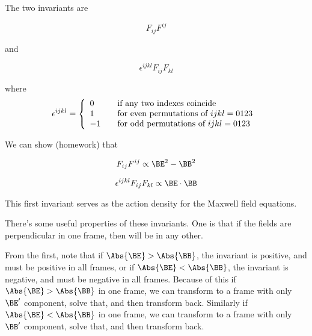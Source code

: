 The two invariants are

\begin{equation}\label{eqn:relativisticElectrodynamicsL11:570}
F_{ij}F^{ij}
\end{equation}

and 

\begin{equation}\label{eqn:relativisticElectrodynamicsL11:590}
\epsilon^{ijkl} F_{ij}F_{kl}
\end{equation}

where
\begin{equation}\label{eqn:relativisticElectrodynamicsL11:610}
\epsilon^{ijkl} =
\left\{
\begin{array}{l l}
0 & \quad \mbox{if any two indexes coincide} \\
1 & \quad \mbox{for even permutations of $ijkl=0123$ } \\
-1 & \quad \mbox{for odd permutations of $ijkl=0123$ } \\
\end{array}
\right.
\end{equation}

We can show (homework) that

\begin{equation}\label{eqn:relativisticElectrodynamicsL11:630}
F_{ij}F^{ij} \propto \BE^2 - \BB^2
\end{equation}

\begin{equation}\label{eqn:relativisticElectrodynamicsL11:650}
\epsilon^{ijkl} F_{ij}F_{kl} \propto \BE \cdot \BB
\end{equation}

This first invariant serves as the action density for the Maxwell field equations.

There's some useful properties of these invariants.  One is that if the fields are perpendicular in one frame, then will be in any other.  

From the first, note that if $\Abs{\BE} > \Abs{\BB}$, the invariant is positive, and must be positive in all frames, or if $\Abs{\BE} < \Abs{\BB}$, the invariant is negative, and must be negative in all frames.  Because of this if $\Abs{\BE} > \Abs{\BB}$ in one frame, we can transform to a frame with only $\BE'$ component, solve that, and then transform back.  Similarly if $\Abs{\BE} < \Abs{\BB}$ in one frame, we can transform to a frame with only $\BB'$ component, solve that, and then transform back.

\section{}

